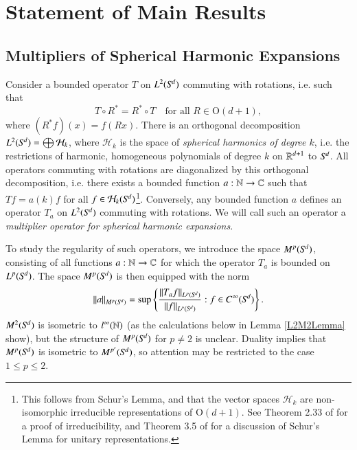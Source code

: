 
\chapter{Statement of Main Results} \label{cha:multipliers_of_an_elliptic_operator}

\section{Multipliers of Spherical Harmonic Expansions}

Consider a bounded operator $T$ on $L^2({S}^{\!{d}})$ commuting with rotations, i.e. such that
%
\begin{equation}
  T \circ R^* = R^* \circ T \quad\text{for all $R \in \text{O}(d+1)$},
\end{equation}
%
where $(R^*\! f)(x) = f(Rx)$. There is an orthogonal decomposition $L^2({S}^{\!{d}}) = \bigoplus \mathcal{H}_k$, where $\mathcal{H}_k$ is the space of \emph{spherical harmonics of degree $k$}, i.e. the restrictions of harmonic, homogeneous polynomials of degree $k$ on $\operatorname{\mathbb{R}}^{d+1}$ to ${S}^{\!{d}}$. All operators commuting with rotations are diagonalized by this orthogonal decomposition, i.e. there exists a bounded function $a: \operatorname{\mathbb{N}} \to \operatorname{\mathbb{C}}$ such that $Tf = a(k) f$ for all $f \in \mathcal{H}_k({S}^{\!{d}})$\footnote{This follows from Schur's Lemma, and that the vector spaces $\mathcal{H}_k$ are non-isomorphic irreducible representations of $\text{O}(d+1)$. See Theorem 2.33 of \cite{Sepanski} for a proof of irreducibility, and Theorem 3.5 of \cite{Folland} for a discussion of Schur's Lemma for unitary representations.}. Conversely, any bounded function $a$ defines an operator $T_a$ on $L^2({S}^{\!{d}})$ commuting with rotations. We will call such an operator a \emph{multiplier operator for spherical harmonic expansions}.

To study the regularity of such operators, we introduce the space $M^p({S}^{\!{d}})$, consisting of all functions $a: \operatorname{\mathbb{N}} \to \operatorname{\mathbb{C}}$ for which the operator $T_a$ is bounded on $L^p({S}^{\!{d}})$. The space $M^p({S}^{\!{d}})$ is then equipped with the norm
%
\begin{equation}
  \| a \|_{M^p({S}^{\!{d}})} = \sup \left\{ \frac{\| T_a f \|_{L^p({S}^{\!{d}})}}{\| f \|_{L^p({S}^{\!{d}})}} : f \in C^\infty({S}^{\!{d}}) \right\}.
\end{equation}
%
$M^2({S}^{\!{d}})$ is isometric to $l^\infty(\operatorname{\mathbb{N}})$ (as the calculations below in Lemma \ref{L2M2Lemma} show), but the structure of $M^p({S}^{\!{d}})$ for $p \neq 2$ is unclear. Duality implies that $M^p({S}^{\!{d}})$ is isometric to $M^{p'}({S}^{\!{d}})$, so attention may be restricted to the case $1 \leq p \leq 2$.

